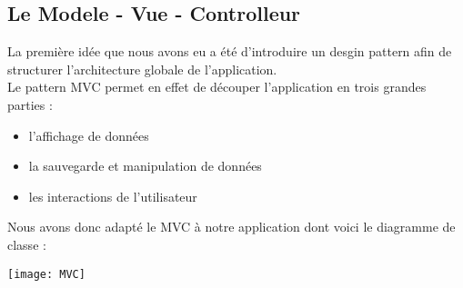 \subsection{Le Modele - Vue - Controlleur}

La première idée que nous avons eu a été d'introduire un desgin pattern afin de structurer l'architecture globale de l'application. \\ Le pattern MVC permet en effet de découper l'application en trois grandes parties :
\begin{itemize}
 	\item l'affichage de données
 	\item la sauvegarde et manipulation de données
 	\item les interactions de l'utilisateur
 \end{itemize}
Nous avons donc adapté le MVC à notre application dont voici le diagramme de classe : \\[0.5cm]
\centerline{\texttt{[image: MVC]}}
